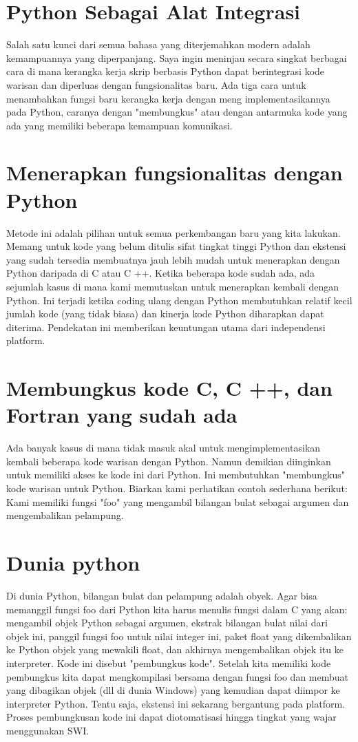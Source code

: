 \documentclass[12pt, times new roman, a4paper]{article}
\begin{document}
\section{Python Sebagai Alat Integrasi}
Salah satu kunci dari semua bahasa yang diterjemahkan modern adalah kemampuannya yang diperpanjang. Saya ingin meninjau secara singkat berbagai cara di mana kerangka kerja skrip berbasis Python dapat berintegrasi kode warisan dan diperluas dengan fungsionalitas baru. Ada tiga cara untuk menambahkan fungsi baru kerangka kerja dengan meng implementasikannya pada Python, caranya dengan "membungkus" atau dengan antarmuka kode yang ada yang memiliki beberapa kemampuan komunikasi.

\section{Menerapkan fungsionalitas dengan Python}
Metode ini adalah pilihan untuk semua perkembangan baru yang kita lakukan. Memang untuk kode yang belum ditulis sifat tingkat tinggi Python dan ekstensi yang sudah tersedia membuatnya jauh lebih mudah untuk menerapkan dengan Python daripada di C atau C ++. Ketika beberapa kode sudah ada, ada sejumlah kasus di mana kami memutuskan untuk menerapkan kembali dengan Python. Ini terjadi ketika coding ulang dengan Python membutuhkan relatif kecil jumlah kode (yang tidak biasa) dan kinerja kode Python diharapkan dapat diterima. Pendekatan ini memberikan keuntungan utama dari independensi platform.

\section{Membungkus kode C, C ++, dan Fortran yang sudah ada}
Ada banyak kasus di mana tidak masuk akal untuk mengimplementasikan kembali beberapa kode warisan dengan Python. Namun demikian
diinginkan untuk memiliki akses ke kode ini dari Python. Ini membutuhkan "membungkus" kode warisan untuk Python. Biarkan kami
perhatikan contoh sederhana berikut: Kami memiliki fungsi "foo" yang mengambil bilangan bulat sebagai argumen dan
mengembalikan pelampung.

\section{Dunia python}
Di dunia Python, bilangan bulat dan pelampung adalah obyek. Agar bisa memanggil fungsi foo
dari Python kita harus menulis fungsi dalam C yang akan: mengambil objek Python sebagai argumen, ekstrak bilangan bulat nilai dari objek ini, panggil fungsi foo untuk nilai integer ini, paket float yang dikembalikan ke Python objek yang mewakili float, dan akhirnya mengembalikan objek itu ke interpreter. Kode ini disebut "pembungkus kode". Setelah kita memiliki kode pembungkus kita dapat mengkompilasi bersama dengan fungsi foo dan membuat yang dibagikan objek (dll di dunia Windows) yang kemudian dapat diimpor ke interpreter Python. Tentu saja, ekstensi ini sekarang bergantung pada platform. Proses pembungkusan kode ini dapat diotomatisasi hingga tingkat yang wajar menggunakan SWI.
\end{document}
